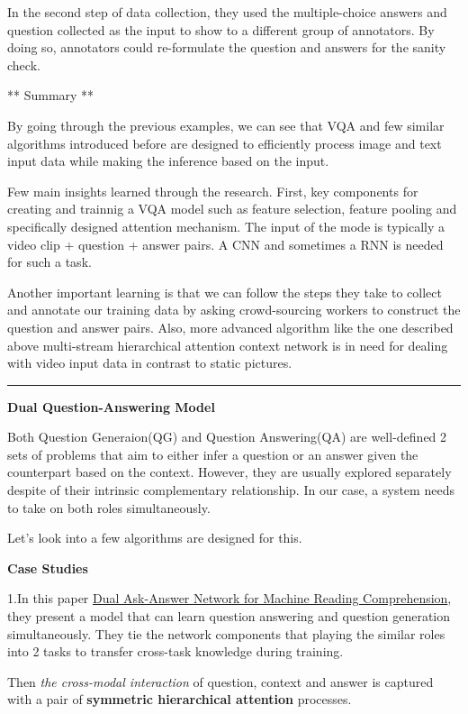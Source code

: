 \documentclass[]{book}
\theoremstyle{definition}
\theoremstyle{definition}
\theoremstyle{definition}
\theoremstyle{remark}
\begin{document}
In the second step of data collection, they used the multiple-choice
answers and question collected as the input to show to a different group
of annotators. By doing so, annotators could re-formulate the question
and answers for the sanity check.

** Summary **

By going through the previous examples, we can see that VQA and few
similar algorithms introduced before are designed to efficiently process
image and text input data while making the inference based on the input.

Few main insights learned through the research. First, key components
for creating and trainnig a VQA model such as feature selection, feature
pooling and specifically designed attention mechanism. The input of the
mode is typically a video clip + question + answer pairs. A CNN and
sometimes a RNN is needed for such a task.

Another important learning is that we can follow the steps they take to
collect and annotate our training data by asking crowd-sourcing workers
to construct the question and answer pairs. Also, more advanced
algorithm like the one described above multi-stream hierarchical
attention context network is in need for dealing with video input data
in contrast to static pictures.

\begin{center}\rule{0.5\linewidth}{\linethickness}\end{center}

\textbf{Dual Question-Answering Model}

Both Question Generaion(QG) and Question Answering(QA) are well-defined
2 sets of problems that aim to either infer a question or an answer
given the counterpart based on the context. However, they are usually
explored separately despite of their intrinsic complementary
relationship. In our case, a system needs to take on both roles
simultaneously.

Let's look into a few algorithms are designed for this.

\textbf{Case Studies}

1.In this paper \href{https://arxiv.org/pdf/1809.01997.pdf}{Dual
Ask-Answer Network for Machine Reading Comprehension}, they present a
model that can learn question answering and question generation
simultaneously. They tie the network components that playing the similar
roles into 2 tasks to transfer cross-task knowledge during training.

Then \emph{the cross-modal interaction} of question, context and answer
is captured with a pair of \textbf{symmetric hierarchical attention}
processes.
\end{document}
